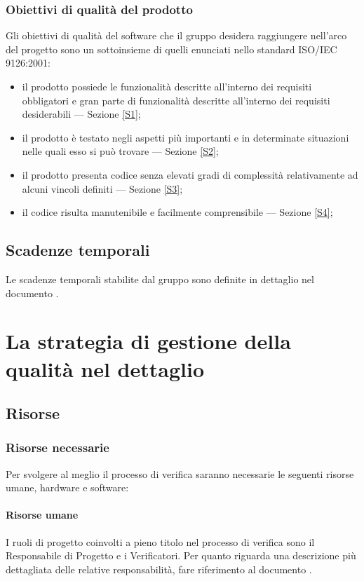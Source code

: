 		\subsubsection{Obiettivi di qualità del prodotto}
		Gli obiettivi di qualità del software che il gruppo \hx{} desidera raggiungere nell'arco del progetto sono un sottoinsieme di quelli enunciati nello standard ISO/IEC 9126:2001:
		\begin{itemize}
			\item il prodotto possiede le funzionalità descritte all'interno dei requisiti obbligatori e gran parte di funzionalità descritte all'interno dei requisiti desiderabili --- Sezione \ref{S1};
			\item il prodotto è testato negli aspetti più importanti e in determinate situazioni nelle quali esso si può trovare --- Sezione \ref{S2};
			\item il prodotto presenta codice senza elevati gradi di complessità relativamente ad alcuni vincoli definiti –-- Sezione \ref{S3};
			\item il codice risulta manutenibile e facilmente comprensibile –-- Sezione \ref{S4};
		\end{itemize}
	\subsection{Scadenze temporali}
	Le scadenze temporali stabilite dal gruppo sono definite in dettaglio nel documento \PdP.
\newpage
\section{La strategia di gestione della qualità nel dettaglio}
	\subsection{Risorse}
		\subsubsection{Risorse necessarie}
		Per svolgere al meglio il processo di verifica saranno necessarie le seguenti risorse umane, hardware e software:
			\paragraph{Risorse umane}
			I ruoli di progetto coinvolti a pieno titolo nel processo di verifica sono il Responsabile di Progetto e i Verificatori. Per quanto riguarda una descrizione più dettagliata delle relative responsabilità, fare riferimento al documento \NdP.
